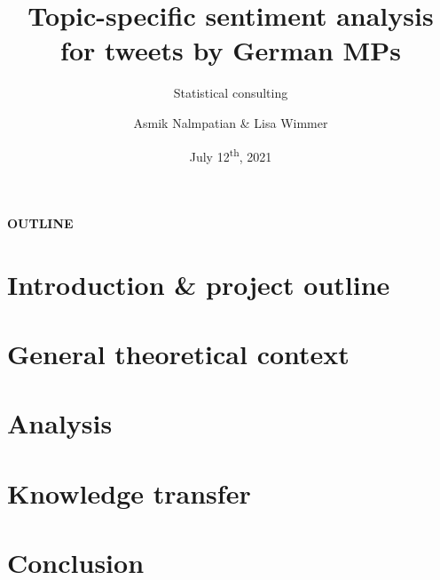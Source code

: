 \documentclass[11pt, t, aspectratio = 1610, table]{beamer}
\title[Consulting \LaTeX\ Beamer theme]{Topic-specific sentiment analysis for 
tweets by German MPs}
\subtitle{Statistical consulting}
\author{Asmik Nalmpatian \& Lisa Wimmer}
\date{July 12\textsuperscript{th}, 2021}
\begin{document}
{


  
  
  \begin{frame}
    \titlepage
  \end{frame}
  
}	


\begin{frame}[noframenumbering]{}

\vspace{1.5em}
\Large{\textbf{OUTLINE}}

\vfill
\vfill

\tableofcontents

\end{frame}


\section{Introduction \& project outline}
\label{intro}


\section{General theoretical context}
\label{theory}


\section{Analysis}
\label{analysis}


\section{Knowledge transfer}
\label{transfer}


\section{Conclusion}
\label{discussion}

\end{document}
